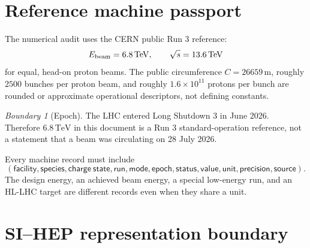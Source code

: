 \documentclass[11pt,a4paper]{article}
\theoremstyle{definition}
\theoremstyle{plain}
\theoremstyle{remark}
\newtheorem{warning}[definition]{Boundary}
\newcommand{\TeV}{\mathrm{TeV}}
\newcommand{\Ocal}{\mathcal O}
\newcommand{\Kcal}{\mathcal K}
\newcommand{\Rcal}{\mathcal R}
\begin{document}
\begin{center}
\end{center}

\section{Reference machine passport}

The numerical audit uses the CERN public Run 3 reference:
\[
E_{\rm beam}=6.8\,\TeV,\qquad
\sqrt{s}=13.6\,\TeV
\]
for equal, head-on proton beams. The public circumference
\(C=26659\,\mathrm m\), roughly \(2500\) bunches per proton beam,
and roughly \(1.6\times10^{11}\) protons per bunch are rounded or
approximate operational descriptors, not defining constants.

\begin{warning}[Epoch]
The LHC entered Long Shutdown 3 in June 2026. Therefore
\(6.8\,\TeV\) in this document is a Run 3 standard-operation
reference, not a statement that a beam was circulating on
28 July 2026.
\end{warning}

Every machine record must include
\[
(\mathsf{facility},\mathsf{species},\mathsf{charge\ state},
\mathsf{run},\mathsf{mode},\mathsf{epoch},\mathsf{status},
\mathsf{value},\mathsf{unit},\mathsf{precision},\mathsf{source}).
\]
The design energy, an achieved beam energy, a special low-energy run,
and an HL-LHC target are different records even when they share a unit.

\section{SI--HEP representation boundary}
\end{document}

